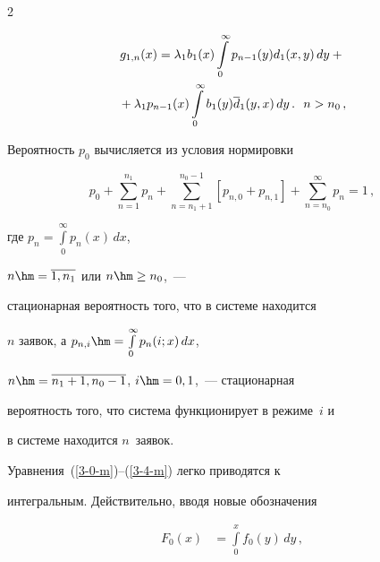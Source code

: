 \begin{multicols}{2}
\vspace*{-12pt}





\noindent


\begin{multline}


\label{3-gf-3-m}


g_{1,n}(x)= \lambda_1 b_1(x) \int\limits_0^\infty p_{n-1}(y) d_1(x,y)\, dy


+{}\\


{}+ \lambda_1 p_{n-1}(x) \int\limits_0^\infty b_1(y) \d_1(y,x)\, dy\,.


\ \ n>n_0\,,


\end{multline}







Вероятность $p_0$ вычисляется из условия нормировки


$$


p_0 + \sum\limits_{n=1}^{n_1} p_n+\sum\limits_{n=n_1+1}^{n_0-1} \left[p_{n,0} + p_{n,1}\right]


+


\sum\limits_{n=n_0}^{\infty} p_n = 1\,,


$$


где $p_n = \int\limits_0^\infty p_n(x)\, dx$,


$n\hm=\overline{1,n_1}$ или $n\hm\ge n_0$,~---


стационарная вероятность того, что в системе находится


$n$ заявок, а $p_{n,i} \hm= \int\limits_0^\infty p_n(i;x)\, dx$,


$n\hm=\overline{n_1+1,n_0-1}$, $i\hm=0,1$,~--- стационарная


вероятность того, что система функционирует в режиме~$i$ и


в системе находится $n$~заявок.





Уравнения~(\ref{3-0-m})--(\ref{3-4-m}) легко приводятся к


интегральным. Действительно, вводя новые обозначения




\begin{align*}


F_0(x) &= \int\limits_0^x f_0(y)\, dy\,,



\end{align*}
\end{multicols}
